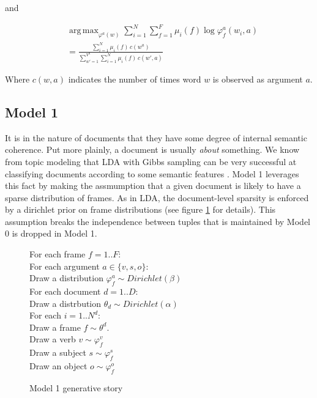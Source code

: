 \documentclass[11pt,twocolumn,DIV=11]{scrartcl}
\renewcommand\phi\varphi
\DeclareMathOperator*{\argmax}{arg\,max}
\begin{document}
and

\begin{align}
&\argmax_{\phi^a(w)}\sum_{i=1}^N\sum_{f=1}^F\mu_i(f)\log \phi_f^a(w_i,a)\nonumber\\
&= \frac{\sum_{i=1}^N \mu_i(f)\,c(w^a)}{\sum_{w'=1}^{V^a}\sum_{i=1}^N \mu_i(f)\,c(w',a)}
\end{align}

Where $c(w,a)$ indicates the number of times word $w$ is observed as argument $a$.

\subsection{Model 1}

It is in the nature of documents that they have some degree of internal semantic
coherence. Put more plainly, a document is usually \emph{about} something. We
know from topic modeling that LDA with Gibbs sampling can be very successful at
classifying documents according to some semantic features \citep{griffiths2004}.
Model 1 leverages this fact by making the assmumption that a given document is 
likely to have a sparse distribution of frames. As in LDA, the document-level
sparsity is enforced by a dirichlet prior on frame distributions (see figure
\ref{gen1} for details). This assumption breaks the independence between tuples 
that is maintained by Model 0 is dropped in Model 1.

\begin{figure}

    \begin{snugshade}
    \scriptsize
    For each frame $f=1..F$:\\
    \hspace*{15pt} For each argument $a\in\{v,s,o\}$:\\
    \hspace*{30pt} Draw a distribution $\phi_f^a\sim Dirichlet(\beta)$\\
    For each document $d=1..D$:\\
    \hspace*{15pt} Draw a distrbution $\theta_d \sim Dirichlet(\alpha)$\\
    \hspace*{30pt} For each $i = 1..N^d$:\\
    \hspace*{30pt} Draw a frame $f \sim \theta^d$.\\
    \hspace*{30pt} Draw a verb $v \sim \phi_f^v$\\
    \hspace*{30pt} Draw a subject $s \sim \phi_f^s$\\
    \hspace*{30pt} Draw an object $o \sim \phi_f^o$
    \end{snugshade}

    

    \caption{Model 1 generative story}
    \label{gen1}

\end{figure}
\end{document}
